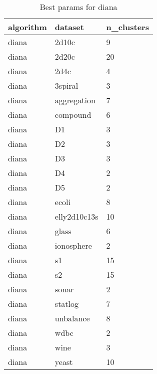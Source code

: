 \begin{table}[H]
\centering
\caption{Best params for diana}
\label{tab:params:diana}
\begin{tabular}{|l|l|l|}
\hline
algorithm & dataset & n\_clusters \\
\hline
diana & 2d10c & 9 \\
\hline
diana & 2d20c & 20 \\
\hline
diana & 2d4c & 4 \\
\hline
diana & 3spiral & 3 \\
\hline
diana & aggregation & 7 \\
\hline
diana & compound & 6 \\
\hline
diana & D1 & 3 \\
\hline
diana & D2 & 3 \\
\hline
diana & D3 & 3 \\
\hline
diana & D4 & 2 \\
\hline
diana & D5 & 2 \\
\hline
diana & ecoli & 8 \\
\hline
diana & elly2d10c13s & 10 \\
\hline
diana & glass & 6 \\
\hline
diana & ionosphere & 2 \\
\hline
diana & s1 & 15 \\
\hline
diana & s2 & 15 \\
\hline
diana & sonar & 2 \\
\hline
diana & statlog & 7 \\
\hline
diana & unbalance & 8 \\
\hline
diana & wdbc & 2 \\
\hline
diana & wine & 3 \\
\hline
diana & yeast & 10 \\
\hline
\end{tabular}
\end{table}